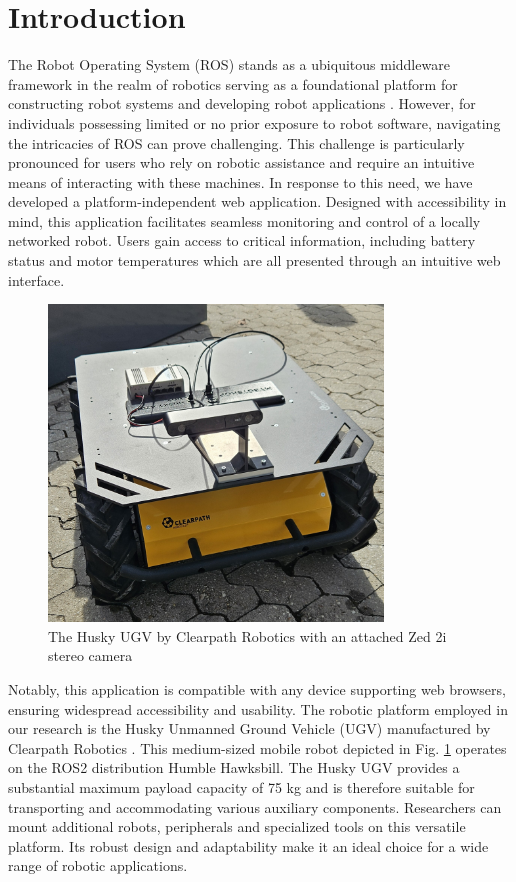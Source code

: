 \documentclass[conference]{IEEEtran}
\begin{document}
\section{Introduction}
The Robot Operating System (ROS) stands as a ubiquitous middleware framework in the realm of robotics serving as a foundational platform for constructing robot systems and developing robot applications \cite{rosOrg}. 
However, for individuals possessing limited or no prior exposure to robot software, navigating the intricacies of ROS can prove challenging. 
This challenge is particularly pronounced for users who rely on robotic assistance and require an intuitive means of interacting with these machines.
In response to this need, we have developed a platform-independent web application. 
Designed with accessibility in mind, this application facilitates seamless monitoring and control of a locally networked robot. Users gain access to critical information, including battery status and motor temperatures which are all presented through an intuitive web interface. 
\begin{figure}[htp]
    \centerline{\includegraphics[width=8.9cm]{Pictures/huskyzed2.jpg}}
    \caption{The Husky UGV by Clearpath Robotics with an attached Zed 2i stereo camera}
    \label{fig:huskyClearpath}
\end{figure}
Notably, this application is compatible with any device supporting web browsers, ensuring widespread accessibility and usability.
The robotic platform employed in our research is the Husky Unmanned Ground Vehicle (UGV) manufactured by Clearpath Robotics \cite{huskyClearpath}. This medium-sized mobile robot depicted in Fig. \ref{fig:huskyClearpath} operates on the ROS2 distribution Humble Hawksbill.
The Husky UGV provides a substantial maximum payload capacity of 75 kg and is therefore suitable for transporting and accommodating various auxiliary components. Researchers can mount additional robots, peripherals and specialized tools on this versatile platform. Its robust design and adaptability make it an ideal choice for a wide range of robotic applications. \cite{huskyClearpath} 
\end{document}
